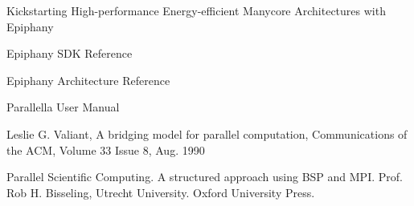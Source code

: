 \documentclass[fleqn]{article}
\renewcommand{\(}{\left(}
\renewcommand{\)}{\right)}
\begin{document}
\begin{thebibliography}{9}

  Kickstarting High-performance Energy-efficient Manycore Architectures with Epiphany

  Epiphany SDK Reference

  Epiphany Architecture Reference

  Parallella User Manual

    Leslie G. Valiant, A bridging model for parallel computation, Communications of the ACM, Volume 33 Issue 8, Aug. 1990

    Parallel Scientific Computing. A structured approach using BSP and MPI. Prof. Rob H. Bisseling, Utrecht University. Oxford University Press.

\end{thebibliography}
\end{document}

